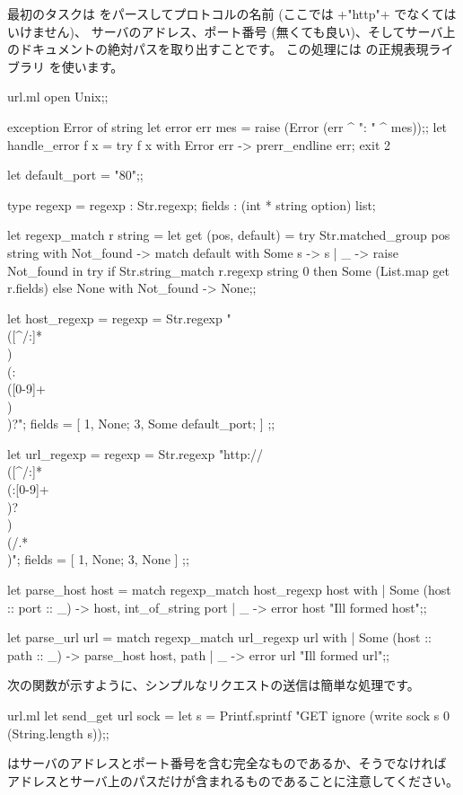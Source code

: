 最初のタスクは \URL をパースしてプロトコルの名前 (ここでは \ml+"http"+ でなくてはいけません)、
サーバのアドレス、ポート番号 (無くても良い)、そしてサーバ上のドキュメントの絶対パスを取り出すことです。
この処理には \ocaml の正規表現ライブラリ  を使います。
%
\begin{listingcodefile}{url.ml}
open Unix;;

exception Error of string
let error err mes = raise (Error (err ^ ": " ^ mes));;
let handle_error f x = try f x with Error err -> prerr_endline err; exit 2

let default_port = "80";;

type regexp = { regexp : Str.regexp; fields : (int * string option) list; }

let regexp_match r string =
  let get (pos, default) =
    try Str.matched_group pos string
    with Not_found ->
      match default with Some s -> s | _ -> raise Not_found in
  try
    if Str.string_match r.regexp string 0 then
      Some (List.map get r.fields)
    else None
  with Not_found -> None;;

let host_regexp =
  { regexp = Str.regexp "\\([^/:]*\\)\\(:\\([0-9]+\\)\\)?";
    fields = [ 1, None; 3, Some default_port; ] };;

let url_regexp =
  { regexp = Str.regexp "http://\\([^/:]*\\(:[0-9]+\\)?\\)\\(/.*\\)";
    fields = [ 1, None; 3, None ] };;

let parse_host host = match regexp_match host_regexp host with
  | Some (host :: port :: _) -> host, int_of_string port
  | _ -> error host "Ill formed host";;

let parse_url url = match regexp_match url_regexp url with
  | Some (host :: path :: _) -> parse_host host, path
  | _ -> error url "Ill formed url";;
\end{listingcodefile}
%
次の関数が示すように、シンプルなリクエストの送信は簡単な処理です。
%
\begin{listingcodefile}{url.ml}
let send_get url sock =
  let s = Printf.sprintf "GET %
  ignore (write sock s 0 (String.length s));;
\end{listingcodefile}
%
\URL はサーバのアドレスとポート番号を含む完全なものであるか、そうでなければ
アドレスとサーバ上のパスだけが含まれるものであることに注意してください。

